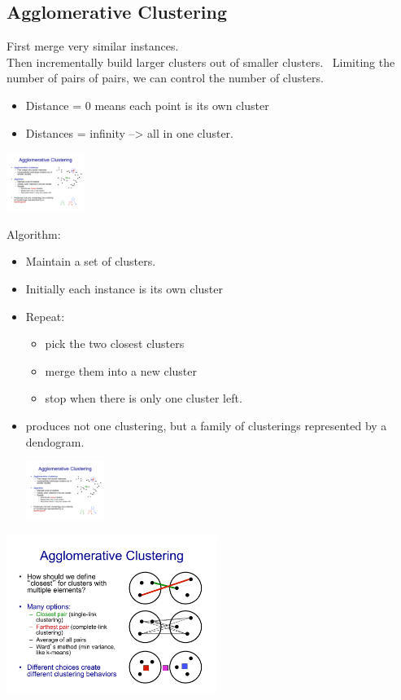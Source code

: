 \subsection{Agglomerative Clustering}
First merge very similar instances. \hfill \\
Then incrementally build larger clusters out of smaller clusters. \hfill \
Limiting the number of pairs of pairs, we can control the number of clusters.
\begin{itemize} 
	\item Distance = 0 means each point is its own cluster
        \item Distances = infinity --> all in one cluster. 
\end{itemize}

\includegraphics[width=1.0in]{figures/agg_clustering.pdf}

Algorithm:
\begin{itemize}
	\item Maintain a set of clusters.
	\item Initially each instance is its own cluster
	\item Repeat:
		\begin{itemize}
			\item pick the two closest clusters
			\item merge them into a new cluster
			\item stop when there is only one cluster left. 
		\end{itemize}
	\item produces not one clustering, but a family of clusterings represented by a dendogram.
		
		\includegraphics[width=1.0in]{figures/dendogram.pdf}
\end{itemize}

\includegraphics[width=2.7in]{figures/agglomerative_clustering_distance_options.pdf}

